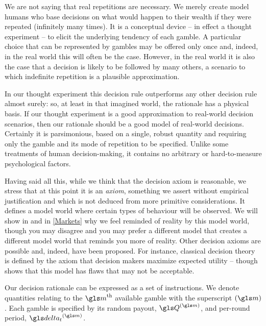 We are not saying that real repetitions are necessary. We 
merely create model humans who base decisions on what would 
happen to their wealth if they were repeated (infinitely many times). It is a 
conceptual device -- in effect a thought experiment -- to elicit the 
underlying tendency of each gamble. A particular choice that can be 
represented by gambles 
may be offered only once and, indeed, in the real world this will 
often be the case. However, in the real world it is also the case 
that a decision is likely to be followed by many others, a scenario 
to which indefinite repetition is a plausible approximation.

In our thought experiment this decision rule outperforms any other 
decision rule almost surely: so, at least in that imagined world, the 
rationale has a physical basis. If our thought experiment is a good 
approximation to real-world decision scenarios, then our rationale 
should be a good model of real-world decisions. Certainly it is 
parsimonious, based on a single, 
robust quantity and requiring only the gamble and its mode of repetition 
to be specified. Unlike some treatments of human decision-making, it 
contains no arbitrary or hard-to-measure psychological factors.

Having said all this, while we think that the decision axiom 
is reasonable, we stress that at this point it is an \textit{axiom}, \ie something we assert without empirical justification and which is not deduced from more primitive considerations. It 
defines a model world where certain types of behaviour will be observed. 
We will show in  and in \cref{Markets} why we feel reminded 
of reality by this model world, though you may disagree 
and you may prefer a different model that creates a different model world
that reminds you more of reality.
Other decision axioms are 
possible and, indeed, have been proposed. For instance, 
classical decision theory is defined by the axiom that decision
makers maximize expected utility -- though  
shows that this model has flaws that may not be acceptable. 


Our decision rationale can be expressed as a set of instructions.
We denote quantities relating to the $\m^\text{th}$ available gamble with the 
superscript $(\m)$. Each gamble is specified by its random payout, $\Q^{(\m)}$, and 
per-round period, $\dt^{(\m)}$. 

